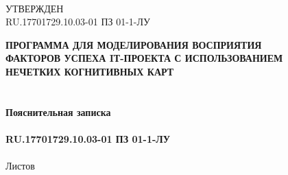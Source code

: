 \documentclass{article}
\begin{document}
    \newpage
    \clearpage
    \begin{textbf}
        \\
        УТВЕРЖДЕН\\
        RU.17701729.10.03-01 ПЗ 01-1-ЛУ\\
    \end{textbf}
    \bigskip
    \begin{center}
        \topskip=0pt
        \vspace*{\fill}
        \textbf{ПРОГРАММА ДЛЯ МОДЕЛИРОВАНИЯ ВОСПРИЯТИЯ\\
        ФАКТОРОВ УСПЕХА IТ-ПРОЕКТА С ИСПОЛЬЗОВАНИЕМ\\
        НЕЧЕТКИХ КОГНИТИВНЫХ КАРТ\\
        ~\\
        ~\\
        Пояснительная записка\\
        ~\\
        RU.17701729.10.03-01 ПЗ 01-1-ЛУ}\\
        ~\\
        Листов \ztotpages\\
        \vspace*{\fill}
    \end{center}
    \begin{center}
    \end{center}
    \newpage
    \tableofcontents
    \newpage
\end{document}
